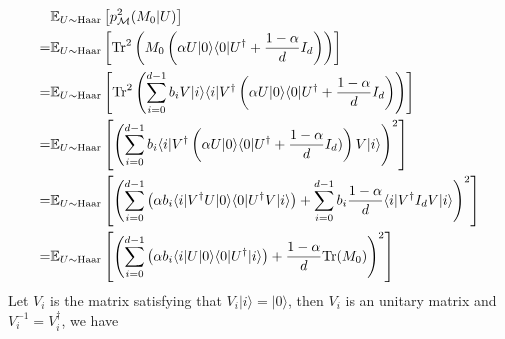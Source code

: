     \begin{equation}
        \begin{aligned}
            & \mathbb{E}_{U \sim \mathrm{Haar}}\left[ p^2_{\mathcal{M}}(M_0| U)\right] \\
            = & \mathbb{E}_{U \sim \mathrm{Haar}}\left[\mathrm{Tr}^2\left(M_0 \left( \alpha U | 0 \rangle \langle 0 | U^\dagger + \frac{1-\alpha}{d} I_d\right)\right)\right] \\
            = & \mathbb{E}_{U \sim \mathrm{Haar}}\left[\mathrm{Tr}^2\left(\sum_{i=0}^{d-1} b_i V |i \rangle \langle i | V^\dagger \left( \alpha U | 0 \rangle \langle 0 | U^\dagger + \frac{1-\alpha}{d} I_d\right)\right)\right] \\
            = & \mathbb{E}_{U \sim \mathrm{Haar}}\left[\left(\sum_{i=0}^{d-1} b_i  \langle i | V^\dagger \left( \alpha U | 0 \rangle \langle 0 | U^\dagger + \frac{1-\alpha}{d} I_d)\right)V |i \rangle\right)^2\right] \\
            = & \mathbb{E}_{U \sim \mathrm{Haar}}\left[\left(\sum_{i=0}^{d-1}  \left(\alpha b_i  \langle i | V^\dagger U | 0 \rangle \langle 0 | U^\dagger V |i \rangle\right) + \sum_{i=0}^{d-1} b_i\frac{1-\alpha}{d} \langle i | V^\dagger I_dV |i \rangle\right)^2\right] \\
            = & \mathbb{E}_{U \sim \mathrm{Haar}}\left[\left(\sum_{i=0}^{d-1} \left(\alpha b_i  \langle i |U | 0 \rangle \langle 0 | U^\dagger|i \rangle\right) + \frac{1-\alpha}{d}\mathrm{Tr}(M_0)\right)^2\right] \\
        \end{aligned}
    \end{equation}
    Let $V_i$ is the matrix satisfying that $V_i|i\rangle = |0\rangle$, then $V_i$ is an unitary matrix and $V_i^{-1} = V_i^\dagger$, we have
